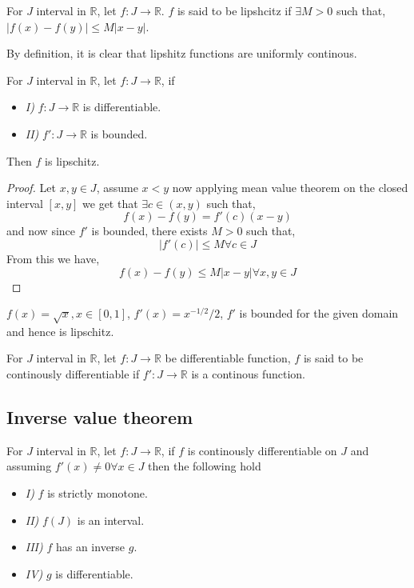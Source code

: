 \documentclass[11pt,a4paper]{colorart}
\def\R{\mathbb{R}}
\def\ra{\rightarrow}
\begin{document}
\begin{definition}
	For $J$ interval in $\R$, let $f:J\ra\R$. $f$ is said to be lipshcitz if $\exists M>0$ such that, $|f(x)-f(y)|\leq M|x-y|$.
\end{definition}

By definition, it is clear that lipshitz functions are uniformly continous.

\begin{theorem}
	For $J$ interval in $\R$, let $f:J\ra\R$, if 
	\begin{itemize}
		\item \textit{I)} $f:J\ra\R$ is differentiable.
		\item \textit{II)} $f':J\ra\R$ is bounded.
	\end{itemize}
	Then $f$ is lipschitz.
\end{theorem}

\begin{proof}
	Let $x,y\in J$, assume $x<y$ now applying mean value theorem on the closed interval $[x,y]$ we get that $\exists c \in (x,y)$ such that,
	\[ f(x) - f(y) = f'(c)(x-y) \]
	and now since $f'$ is bounded, there exists $M>0$ such that,
	\[ |f'(c)| \leq M \forall c \in J \]
	From this we have,
	\[ f(x) - f(y) \leq M|x-y| \forall x,y \in J \]
\end{proof}

\begin{example}
	$f(x) = \sqrt{x}, x \in [0,1]$, $f'(x) = x^{-1/2}/2$, $f'$ is bounded for the given domain and hence is lipschitz.
\end{example}

\begin{definition}
	For $J$ interval in $\R$, let $f:J\ra\R$ be differentiable function, $f$ is said to be continously differentiable if $f':J \ra \R$ is a continous function.
\end{definition}

\subsection{Inverse value theorem}

\begin{theorem}
	For $J$ interval in $\R$, let $f:J\ra\R$, if $f$ is continously differentiable on $J$ and assuming $f'(x) \neq 0 \forall x \in J$ then the following hold
	\begin{itemize}
		\item \textit{I)} $f$ is strictly monotone.
		\item \textit{II)} $f(J)$ is an interval.
		\item \textit{III)} $f$ has an inverse $g$.
		\item \textit{IV)} $g$ is differentiable.
	\end{itemize}
\end{theorem}
\end{document}
